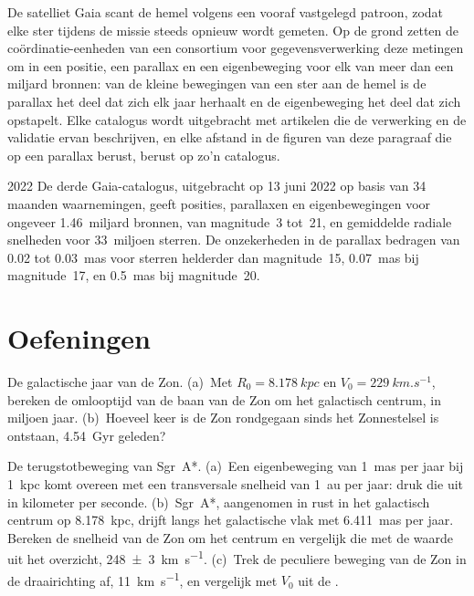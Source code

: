 \begin{inthelab}
De satelliet Gaia scant de hemel volgens een vooraf vastgelegd patroon, zodat elke
ster tijdens de missie steeds opnieuw wordt gemeten. Op de grond zetten de
coördinatie-eenheden van een consortium voor gegevensverwerking deze
metingen om in een positie, een parallax en een eigenbeweging voor elk van
meer dan een miljard bronnen: van de kleine bewegingen van een ster aan de hemel
is de parallax het deel dat zich elk jaar herhaalt en de eigenbeweging
het deel dat zich opstapelt. Elke catalogus wordt uitgebracht met artikelen die
de verwerking en de validatie ervan beschrijven, en elke afstand in de
figuren van deze paragraaf die op een parallax berust, berust op zo'n
catalogus.
\end{inthelab}

\begin{dated}{2022}
De derde Gaia-catalogus, uitgebracht op 13 juni 2022 op basis van 34 maanden
waarnemingen, geeft posities, parallaxen en eigenbewegingen voor ongeveer
1.46~miljard bronnen, van magnitude~3 tot~21, en gemiddelde radiale snelheden
voor 33~miljoen sterren. De onzekerheden in de parallax bedragen van 0.02 tot
\qty{0.03}{mas} voor sterren helderder dan magnitude~15, \qty{0.07}{mas} bij
magnitude~17, en \qty{0.5}{mas} bij magnitude~20.
\end{dated}

\section{Oefeningen}

\begin{exercise}[$\star$]\label{exo:b3:milky-way-galaxies:1}
De galactische jaar van de Zon. (a)~Met $R_0 = \qty{8.178}{kpc}$ en
$V_0 = \qty{229}{km.s^{-1}}$, bereken de omlooptijd van de baan van de Zon om
het galactisch centrum, in miljoen jaar. (b)~Hoeveel keer is de Zon
rondgegaan sinds het Zonnestelsel is ontstaan, \qty{4.54}{Gyr} geleden?
\end{exercise}

\begin{exercise}[$\star$]\label{exo:b3:milky-way-galaxies:2}
De terugstotbeweging van Sgr~A*. (a)~Een eigenbeweging van \qty{1}{mas} per jaar
bij \qty{1}{kpc} komt overeen met een transversale snelheid van \qty{1}{au} per jaar: druk die uit in
kilometer per seconde. (b)~Sgr~A*, aangenomen in rust in het galactisch centrum
op \qty{8.178}{kpc}, drijft langs het galactische vlak met \qty{6.411}{mas}
per jaar. Bereken de snelheid van de Zon om het centrum en vergelijk die met de
waarde uit het overzicht, \qty[separate-uncertainty=true]{248 \pm 3}{km.s^{-1}}. (c)~Trek de
peculiere beweging van de Zon in de draairichting af, \qty{11}{km.s^{-1}}, en
vergelijk met $V_0$ uit de .
\end{exercise}

